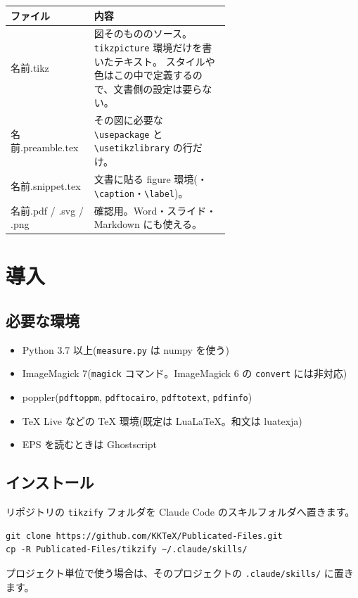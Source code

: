 \documentclass[a4paper,11pt]{ltjsarticle}
\newcommand{\cmd}[1]{\texttt{#1}}
\begin{document}
\begin{center}
\begin{tabular}{>{\ttfamily}l p{0.62\linewidth}}
\toprule
\normalfont ファイル & 内容 \\
\midrule
名前.tikz & 図そのもののソース。\verb|tikzpicture| 環境だけを書いたテキスト。
             スタイルや色はこの中で定義するので、文書側の設定は要らない。 \\
名前.preamble.tex & その図に必要な \verb|\usepackage| と \verb|\usetikzlibrary| の行だけ。 \\
名前.snippet.tex & 文書に貼る figure 環境(\verb||・\verb|\caption|・\verb|\label|)。 \\
名前.pdf / .svg / .png & 確認用。Word・スライド・Markdown にも使える。 \\
\bottomrule
\end{tabular}
\end{center}

\section{導入}

\subsection{必要な環境}
\begin{itemize}
\item Python 3.7 以上(\cmd{measure.py} は numpy を使う)
\item ImageMagick 7(\cmd{magick} コマンド。ImageMagick 6 の \cmd{convert} には非対応)
\item poppler(\cmd{pdftoppm}, \cmd{pdftocairo}, \cmd{pdftotext}, \cmd{pdfinfo})
\item TeX Live などの TeX 環境(既定は Lua\LaTeX。和文は luatexja)
\item EPS を読むときは Ghostscript
\end{itemize}

\subsection{インストール}
リポジトリの \cmd{tikzify} フォルダを Claude Code のスキルフォルダへ置きます。
\begin{Verbatim}
git clone https://github.com/KKTeX/Publicated-Files.git
cp -R Publicated-Files/tikzify ~/.claude/skills/
\end{Verbatim}
プロジェクト単位で使う場合は、そのプロジェクトの \cmd{.claude/skills/} に置きます。
\end{document}
